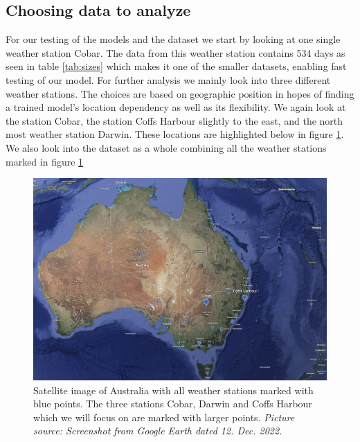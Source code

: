 \documentclass[11pt]{article}
\begin{document}
\subsection{Choosing data to analyze} %
\label{sub:Weather stations}
For our testing of the models and the dataset we start by looking at one single weather station Cobar. The data from this weather station contains 534 days as seen in table \ref{tab:sizes} which makes it one of the smaller datasets, enabling fast testing of our model. For further analysis we mainly look into three different weather stations. The choices are based on geographic position in hopes of finding a trained model's location dependency as well as its flexibility. We again look at the station Cobar, the station Coffs Harbour slightly to the east, and the north most weather station Darwin. These locations are highlighted below in figure \ref{fig:earth}. We also look into the dataset as a whole combining all the weather stations marked in figure \ref{fig:earth}
\begin{figure}[H]
    \centering
    \includegraphics[width=\textwidth]{../figures/earth.png}
    \caption{Satellite image of Australia with all weather stations marked with blue points. The three stations Cobar, Darwin and Coffs Harbour which we will focus on are marked with larger points. \textit{Picture source: Screenshot from Google Earth dated 12. Dec. 2022.}}
    \label{fig:earth}
\end{figure}
\end{document}

